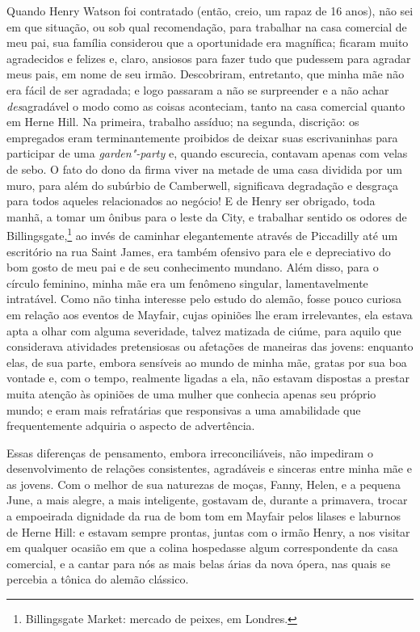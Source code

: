Quando Henry Watson foi contratado (então, creio, um rapaz de 16
anos), não sei em que situação, ou sob qual recomendação, para trabalhar
na casa comercial de meu pai, sua família considerou que a oportunidade
era magnífica; ficaram muito agradecidos e felizes e, claro, ansiosos
para fazer tudo que pudessem para agradar meus pais, em nome de seu
irmão. Descobriram, entretanto, que minha mãe não era fácil de ser
agradada; e logo passaram a não se surpreender e a não achar
\textit{des}agradável o modo como as coisas aconteciam, tanto na casa
comercial quanto em Herne Hill. Na primeira, trabalho assíduo; na
segunda, discrição: os empregados eram terminantemente proibidos de
deixar suas escrivaninhas para participar de uma \textit{garden"-party} e,
quando escurecia, contavam apenas com velas de sebo. O fato do dono da
firma viver na metade de uma casa dividida por um muro, para além do
subúrbio de Camberwell, significava degradação e desgraça para todos
aqueles relacionados ao negócio! E de Henry ser obrigado, toda manhã, a
tomar um ônibus para o leste da City, e trabalhar sentido os odores de
Billingsgate,\footnote{Billingsgate Market: mercado de peixes, em Londres.} ao invés de caminhar elegantemente através de
Piccadilly até um escritório na rua Saint James, era também ofensivo
para ele e depreciativo do bom gosto de meu pai e de seu conhecimento
mundano. Além disso, para o círculo feminino, minha mãe era um fenômeno
singular, lamentavelmente intratável. Como não tinha interesse pelo
estudo do alemão, fosse pouco curiosa em relação aos eventos de Mayfair,
cujas opiniões lhe eram irrelevantes, ela estava apta a olhar com alguma
severidade, talvez matizada de ciúme, para aquilo que considerava
atividades pretensiosas ou afetações de maneiras das jovens: enquanto
elas, de sua parte, embora sensíveis ao mundo de minha mãe, gratas por
sua boa vontade e, com o tempo, realmente ligadas a ela, não estavam
dispostas a prestar muita atenção às opiniões de uma mulher que conhecia
apenas seu próprio mundo; e eram mais refratárias que responsivas a uma
amabilidade que frequentemente adquiria o aspecto de advertência.

Essas diferenças de pensamento, embora irreconciliáveis, não
impediram o desenvolvimento de relações consistentes, agradáveis e
sinceras entre minha mãe e as jovens. Com o melhor de sua naturezas de
moças, Fanny, Helen, e a pequena June, a mais alegre, a mais
inteligente, gostavam de, durante a primavera, trocar a empoeirada
dignidade da rua de bom tom em Mayfair pelos lilases e laburnos de Herne
Hill: e estavam sempre prontas, juntas com o irmão Henry, a nos visitar
em qualquer ocasião em que a colina hospedasse algum correspondente da
casa comercial, e a cantar para nós as mais belas árias da nova ópera,
nas quais se percebia a tônica do alemão clássico.

